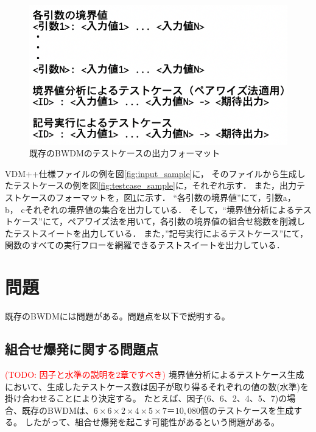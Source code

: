 \documentclass[uplatex, report, a4j, 10pt]{jsbook}
\newcommand\todo[1]{\textcolor{red}{#1}}
\begin{document}
\begin{figure}[t]
  \begin{center}
    \includegraphics[keepaspectratio, width=160mm]{figs/bwdm_format.png}
    \caption{既存のBWDMのテストケースの出力フォーマット}
    \label{fig:bwdm_format}
  \end{center}
\end{figure}

VDM++仕様ファイルの例を図\ref{fig:input_sample}に，
そのファイルから生成したテストケースの例を図\ref{fig:testcase_sample}に，それぞれ示す．
また，出力テストケースのフォーマットを，図\ref{fig:bwdm_format}に示す．
“各引数の境界値”にて，引数a， b， cそれぞれの境界値の集合を出力している．
そして，“境界値分析によるテストケース”にて，ペアワイズ法を用いて，各引数の境界値の組合せ総数を削減したテストスイートを出力している．
また，”記号実行によるテストケース”にて，関数のすべての実行フローを網羅できるテストスイートを出力している．

\section{問題}\label{sec:bwdm_problem}
既存のBWDMには問題がある。問題点を以下で説明する。

\subsection{組合せ爆発に関する問題点}\label{sec:problem_pairwise}
\todo{(TODO: 因子と水準の説明を2章ですべき)}
境界値分析によるテストケース生成において、生成したテストケース数は因子が取り得るそれぞれの値の数(水準)を掛け合わせることにより決定する。
たとえば、因子(6、6、2、4、5、7)の場合、既存のBWDMは、$6 \times 6 \times 2 \times 4 \times 5 \times 7＝10,080個$のテストケースを生成する。
したがって、組合せ爆発を起こす可能性があるという問題がある。
\end{document}
